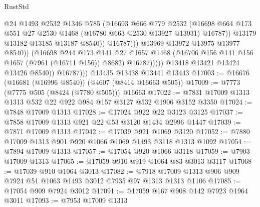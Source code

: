 \begin{lexlean}{RustStd}
\begin{coremodule}
                                    @24
                                    @1493
                                    @2532
                                    @1346
                                    @785
                                    (@16693
                                      @666
                                      @779
                                      @2532
                                      (@16698
                                        @664
                                        @173
                                        @551
                                        @27
                                        @2530
                                        @1468
                                        (@16780 @663 @2530 @13927 @13931)
                                        @16787))
                                    @13179
                                    @13182
                                    @13185
                                    @13187
                                    @8540))
                                @16787)))
                          @13969
                          @13972
                          @13975
                          @13977
                          @8540))
                      (@16698
                        @244
                        @173
                        @141
                        @27
                        @1657
                        @1468
                        (@16706 @156 @141 @156 @1657 (@7961 (@16711 @156)) @8682)
                        @16787)))))
              @13418
              @13421
              @13424
              @13426
              @8540))
          @16787)))
    @13435
    @13438
    @13441
    @13443
@17003 := @16676 (@16681 (@16996 @8540)) (@4607 (@8414 @16663 @505))
@17009 := @7773 (@7775 @505 (@8424 (@7780 @505))) @16663
@17022 := @7831 @17009 @1313 @1313 @532 @22 @922 @984 @157 @3127 @532 @1906 @3152 @3350
@17024 := @7848 @17009 @1313
@17028 := @17024 @922 @22 @3123 @3125
@17037 := @7858 @17009 @1313 @921 @22 @53 @3120 @1434 @2996 @1447
@17039 := @7871 @17009 @1313
@17042 := @17039 @921 @1069 @3120
@17052 := @7880 @17009 @1313 @901 @920 @1066 @1069 @1493 @3118 @1313 @1092
@17054 := @7894 @17009 @1313
@17057 := @17054 @920 @1066 @3118
@17059 := @7903 @17009 @1313
@17065 := @17059 @910 @919 @1064 @83 @3013 @3117
@17068 := @17039 @910 @1064 @3013
@17082 := @7918 @17009 @1313 @906 @909 @7924 @51 @1063 @1493 @3012 @7935 @97 @1313 @1313 @1106
@17085 := @17054 @909 @7924 @3012
@17091 := @17059 @167 @908 @142 @7923 @1964 @3011
@17093 := @7953 @17009 @1313

\end{coremodule}
\end{lexlean}
